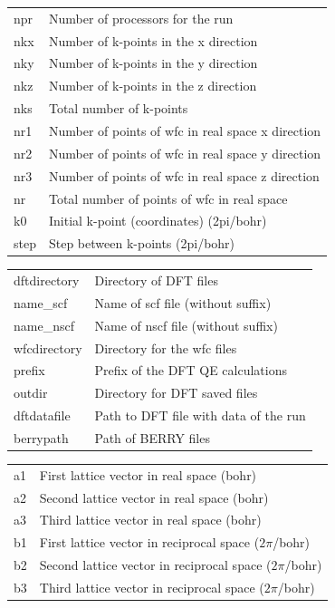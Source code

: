 \documentclass[a4paper,12pt]{report}
\begin{document}
\begin{tabularx}{\textwidth}{Xl}
 npr            & Number of processors for the run \\

 nkx            & Number of k-points in the x direction \\
 nky            & Number of k-points in the y direction \\
 nkz            & Number of k-points in the z direction \\
 nks            & Total number of k-points \\

 nr1            & Number of points of wfc in real space x direction \\
 nr2            & Number of points of wfc in real space y direction \\
 nr3            & Number of points of wfc in real space z direction \\
 nr             & Total number of points of wfc in real space \\

 k0             & Initial k-point (coordinates) (2pi/bohr) \\
 step           & Step between k-points (2pi/bohr) \\
\end{tabularx}
\vspace{0.5cm}

\begin{tabularx}{\textwidth}{Xl}
 dftdirectory   & Directory of DFT files \\
 name\_scf       & Name of scf file (without suffix) \\
 name\_nscf      & Name of nscf file (without suffix) \\
 wfcdirectory   & Directory for the wfc files \\
 prefix         & Prefix of the DFT QE calculations \\
 outdir         & Directory for DFT saved files \\
 dftdatafile    & Path to DFT file with data of the run \\
 berrypath      & Path of BERRY files \\
\end{tabularx}
\vspace{0.5cm}

\begin{tabularx}{\textwidth}{Xl}
 a1             & First lattice vector in real space (bohr) \\
 a2             & Second lattice vector in real space (bohr) \\
 a3             & Third lattice vector in real space (bohr) \\

 b1             & First lattice vector in reciprocal space ($2\pi$/bohr) \\
 b2             & Second lattice vector in reciprocal space ($2\pi$/bohr) \\
 b3             & Third lattice vector in reciprocal space ($2\pi$/bohr) \\
\end{tabularx}
\vspace{0.5cm}
\end{document}
